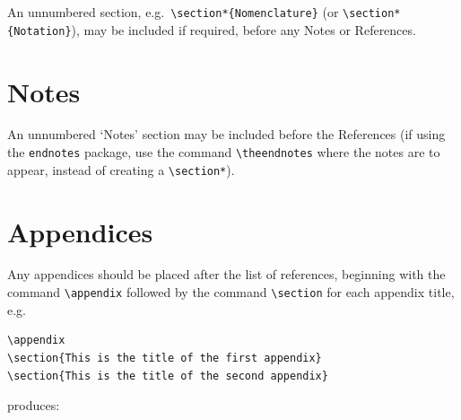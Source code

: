 \documentclass[]{interact}
\theoremstyle{plain}%
\theoremstyle{definition}
\theoremstyle{remark}
\begin{document}
An unnumbered section, e.g.\ \verb"\section*{Nomenclature}" (or \verb"\section*{Notation}"), may be included if required, before any Notes or References.


\section*{Notes}

An unnumbered `Notes' section may be included before the References (if using the \verb"endnotes" package, use the command \verb"\theendnotes" where the notes are to appear, instead of creating a \verb"\section*").






\section{Appendices}

Any appendices should be placed after the list of references, beginning with the command \verb"\appendix" followed by the command \verb"\section" for each appendix title, e.g.
\begin{verbatim}
\appendix
\section{This is the title of the first appendix}
\section{This is the title of the second appendix}
\end{verbatim}
produces:\medskip
\end{document}
